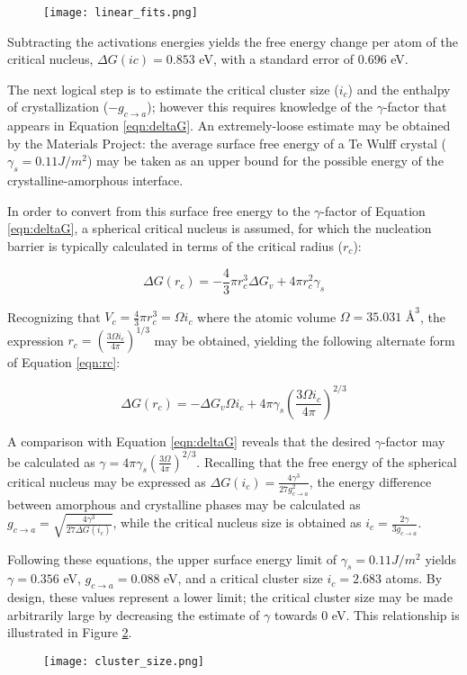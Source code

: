 	\begin{figure}[h]
		\centering
		\texttt{[image: linear\_fits.png]}
		\caption{}
		\label{fig:linear_fits}
	\end{figure}

Subtracting the activations energies yields the free energy change per atom of the critical nucleus, $\Delta G(ic) = 0.853$ eV, with a standard error of 0.696 eV.

The next logical step is to estimate the critical cluster size ($i_c$) and the enthalpy of crystallization ($-g_{c \rightarrow a}$); however this requires knowledge of the $\gamma$-factor that appears in Equation \ref{eqn:deltaG}.  An extremely-loose estimate may be obtained by the Materials Project: the average surface free energy of a Te Wulff crystal ($\gamma_s = 0.11 J/m^2$) may be taken as an upper bound for the possible energy of the crystalline-amorphous interface.

In order to convert from this surface free energy to the $\gamma$-factor of Equation \ref{eqn:deltaG}, a spherical critical nucleus is assumed, for which the nucleation barrier is typically calculated in terms of the critical radius ($r_c$):

\begin{equation}
	\Delta G(r_c) = -\frac{4}{3}\pi r_c^3 \Delta G_v + 4 \pi r_c^2 \gamma_s
	\label{eqn:rc}
\end{equation}

Recognizing that $V_c = \frac{4}{3}\pi r_c^3 = \Omega i_c$ where the atomic volume $\Omega = 35.031$ $\si{\angstrom}^3$, the expression $r_c = \left( \frac{3\Omega i_c}{4\pi} \right)^{1/3}$ may be obtained, yielding the following alternate form of Equation \ref{eqn:rc}:

\begin{equation}
	\Delta G(r_c) = -\Delta G_v \Omega i_c + 4 \pi \gamma_s \left( \frac{3\Omega i_c}{4\pi} \right)^{2/3} 
	\label{eqn:rc_ic}
\end{equation}

A comparison with Equation \ref{eqn:deltaG} reveals that the desired $\gamma$-factor may be calculated as $\gamma = 4 \pi \gamma_s \left( \frac{3\Omega}{4\pi} \right)^{2/3}$.  Recalling that the free energy of the spherical critical nucleus may be expressed as $\Delta G(i_c) = \frac{4 \gamma^3}{27 g^2_{c \rightarrow a}}$, the energy difference between amorphous and crystalline phases may be calculated as $g_{c \rightarrow a} = \sqrt{\frac{4 \gamma^3}{27 \Delta G(i_c)}}$, while the critical nucleus size is obtained as $i_c = \frac{2 \gamma}{3 g_{c \rightarrow a}}$.

Following these equations, the upper surface energy limit of $\gamma_s = 0.11 J/m^2$ yields $\gamma = 0.356$ eV, $g_{c \rightarrow a} = 0.088$ eV, and a critical cluster size $i_c = 2.683$ atoms.  By design, these values represent a lower limit; the critical cluster size may be made arbitrarily large by decreasing the estimate of $\gamma$ towards 0 eV.  This relationship is illustrated in Figure \ref{fig:cluster_size}.

	\begin{figure}[h]
		\centering
		\texttt{[image: cluster\_size.png]}
		\caption{}
		\label{fig:cluster_size}
	\end{figure}
